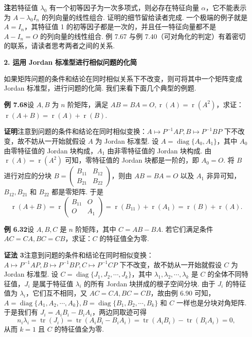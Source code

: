 \documentclass[UTF8, 12pt, fontset=fandol, oneside]{ctexart}
\begin{document}
\noindent\textbf{注}\quad 若特征值 $\lambda_0$ 有一个初等因子为一次多项式，则必存在特征向量 $\alpha$，它不能表示为 $A-\lambda_0I_n$ 的列向量的线性组合. 证明的细节留给读者完成. 一个极端的例子就是 $A=I_n$，其特征值 1 的初等因子都是一次的，并且任一特征向量都不是 $A-I_n=O$ 的列向量的线性组合. 例 7.67 与例 7.40（可对角化的判定）有着密切的联系，请读者思考两者之间的关系.

\noindent\textbf{2. 运用 Jordan 标准型进行相似问题的化简}

如果矩阵问题的条件和结论在同时相似关系下不改变，则可将其中一个矩阵变成 Jordan 标准型，进行问题的化简. 我们来看下面几个典型的例题.

\noindent\textbf{例 7.68}\quad 设 $A,B$ 为 $n$ 阶矩阵，满足 $AB=BA=O,\operatorname{r}(A)=\operatorname{r}(A^2)$，求证：$\operatorname{r}(A+B)=\operatorname{r}(A)+\operatorname{r}(B)$.

\noindent\textbf{证明}\quad 注意到问题的条件和结论在同时相似变换：$A\mapsto P^{-1}AP,B\mapsto P^{-1}BP$ 下不改变，故不妨从一开始就假设 $A$ 为 Jordan 标准型. 设 $A=\operatorname{diag}\{A_0,A_1\}$，其中 $A_0$ 由零特征值的 Jordan 块构成，$A_1$ 由非零特征值的 Jordan 块构成. 由 $\operatorname{r}(A)=\operatorname{r}(A^2)$ 可知，零特征值的 Jordan 块都是一阶的，即 $A_0=O$. 将 $B$ 进行对应的分块 $B=\left(\begin{array}{cc}B_{11}&B_{12}\\B_{21}&B_{22}\end{array}\right)$，则由 $AB=BA=O$ 以及 $A_1$ 非异可知，$B_{12},B_{21}$ 和 $B_{22}$ 都是零矩阵. 于是
\[
\operatorname{r}(A+B)=\operatorname{r}\left(\begin{array}{cc}B_{11}&O\\O&A_1\end{array}\right)=\operatorname{r}(B_{11})+\operatorname{r}(A_1)=\operatorname{r}(B)+\operatorname{r}(A).
\]

\noindent\textbf{例 6.32}\quad 设 $A,B,C$ 是 $n$ 阶矩阵，其中 $C=AB-BA$. 若它们满足条件 $AC=CA,BC=CB$，求证：$C$ 的特征值全为零.

\noindent\textbf{证法 3}\quad 注意到问题的条件和结论在同时相似变换：$A\mapsto P^{-1}AP,B\mapsto P^{-1}BP,C\mapsto P^{-1}CP$ 下不改变，故不妨从一开始就假设 $C$ 为 Jordan 标准型. 设 $C=\operatorname{diag}\{J_1,J_2,\cdots,J_k\}$，其中 $\lambda_1,\lambda_2,\cdots,\lambda_k$ 是 $C$ 的全体不同特征值，$J_i$ 是属于特征值 $\lambda_i$ 的所有 Jordan 块拼成的根子空间分块. 由于 $J_i$ 的特征值为 $\lambda_i$，它们互不相同，又 $AC=CA,BC=CB$，故由例 6.90 可知，$A=\operatorname{diag}\{A_1,A_2,\cdots,A_k\},B=\operatorname{diag}\{B_1,B_2,\cdots,B_k\}$ 和 $C$ 一样也是分块对角矩阵. 于是我们有 $J_i=A_iB_i-B_iA_i$，两边同取迹可得
\[
n_i\lambda_i=\operatorname{tr}(J_i)=\operatorname{tr}(A_iB_i-B_iA_i)=\operatorname{tr}(A_iB_i)-\operatorname{tr}(B_iA_i)=0,
\]
从而 $k=1$ 且 $C$ 的特征值全为零.
\end{document}
